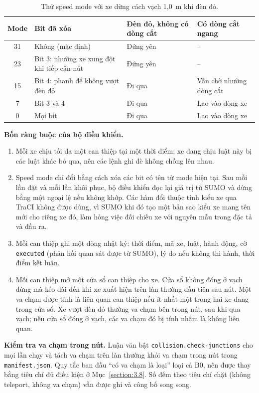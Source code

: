 \documentclass[../DoAn.tex]{subfiles}
\begin{document}
\begin{table}[ht]
\centering
\small
\caption{Thử speed mode với xe dừng cách vạch 1,0~m khi đèn đỏ.}
\label{table:5.1}
\begin{tabular}{|c|p{5.8cm}|p{2.6cm}|p{3.4cm}|}
\hline
\textbf{Mode} & \textbf{Bit đã xóa} & \textbf{Đèn đỏ, không có dòng cắt} & \textbf{Có dòng cắt ngang} \\ \hline
31 & Không (mặc định) & Đứng yên & -- \\ \hline
23 & Bit 3: nhường xe xung đột khi tiếp cận nút & Đứng yên & -- \\ \hline
15 & Bit 4: phanh để không vượt đèn đỏ & Đi qua & Vẫn chờ nhường dòng cắt \\ \hline
7 & Bit 3 và 4 & Đi qua & Lao vào dòng xe \\ \hline
0 & Mọi bit & Đi qua & Lao vào dòng xe \\ \hline
\end{tabular}
\end{table}

\textbf{Bốn ràng buộc của bộ điều khiển.}
\begin{enumerate}[label=(\arabic*)]
    \item Mỗi xe chịu tối đa một can thiệp tại một thời điểm; xe đang chịu luật này bị các luật khác bỏ qua, nên các lệnh ghi đè không chồng lên nhau.
    \item Speed mode chỉ đổi bằng cách xóa các bit có tên từ mode hiện tại. Sau mỗi lần đặt và mỗi lần khôi phục, bộ điều khiển đọc lại giá trị từ SUMO và dừng bằng một ngoại lệ nếu không khớp. Các hàm đổi thuộc tính kiểu xe qua TraCI không được dùng, vì SUMO khi đó tạo một bản sao kiểu xe mang tên mới cho riêng xe đó, làm hỏng việc đối chiếu xe với nguyên mẫu trong đặc tả và đầu ra.
    \item Mỗi can thiệp ghi một dòng nhật ký: thời điểm, mã xe, luật, hành động, cờ \texttt{executed} (phản hồi quan sát được từ SUMO), lý do nếu không thi hành, thời điểm kết luận.
    \item Mỗi can thiệp mở một cửa sổ can thiệp cho xe. Cửa sổ không đóng ở vạch dừng mà kéo dài đến khi xe xuất hiện trên làn thường đầu tiên sau nút. Một va chạm được tính là liên quan can thiệp nếu ít nhất một trong hai xe đang trong cửa sổ. Xe vượt đèn đỏ thường va chạm bên trong nút, sau khi qua vạch; nếu cửa sổ đóng ở vạch, các va chạm đó bị tính nhầm là không liên quan.
\end{enumerate}

\textbf{Kiểm tra va chạm trong nút.} Luận văn bật \texttt{collision.check-junctions} cho mọi lần chạy và tách va chạm trên làn thường khỏi va chạm trong nút trong \texttt{manifest.json}. Quy tắc ban đầu ``có va chạm là loại'' loại cả B0, nên được thay bằng tiêu chí đủ điều kiện ở Mục~\ref{section:3.8}. Số đếm theo tiêu chí chặt (không teleport, không va chạm) vẫn được ghi và công bố song song.
\end{document}
